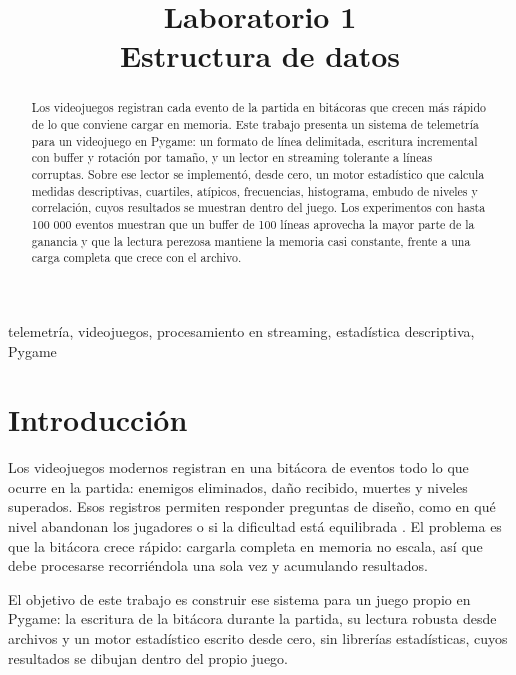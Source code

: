 \documentclass[conference]{IEEEtran}
\begin{document}
\title{Laboratorio 1\\Estructura de datos}

\author{
}

\maketitle

\begin{abstract}
Los videojuegos registran cada evento de la partida en bitácoras que crecen más rápido de lo que conviene cargar en memoria. Este trabajo presenta un sistema de telemetría para un videojuego en Pygame: un formato de línea delimitada, escritura incremental con buffer y rotación por tamaño, y un lector en streaming tolerante a líneas corruptas. Sobre ese lector se implementó, desde cero, un motor estadístico que calcula medidas descriptivas, cuartiles, atípicos, frecuencias, histograma, embudo de niveles y correlación, cuyos resultados se muestran dentro del juego. Los experimentos con hasta 100 000 eventos muestran que un buffer de 100 líneas aprovecha la mayor parte de la ganancia y que la lectura perezosa mantiene la memoria casi constante, frente a una carga completa que crece con el archivo.
\end{abstract}

\begin{IEEEkeywords}
telemetría, videojuegos, procesamiento en streaming, estadística descriptiva, Pygame
\end{IEEEkeywords}

\section{Introducción}
Los videojuegos modernos registran en una bitácora de eventos todo lo que ocurre en la partida: enemigos eliminados, daño recibido, muertes y niveles superados. Esos registros permiten responder preguntas de diseño, como en qué nivel abandonan los jugadores o si la dificultad está equilibrada \cite{drachen}. El problema es que la bitácora crece rápido: cargarla completa en memoria no escala, así que debe procesarse recorriéndola una sola vez y acumulando resultados.

El objetivo de este trabajo es construir ese sistema para un juego propio en Pygame: la escritura de la bitácora durante la partida, su lectura robusta desde archivos y un motor estadístico escrito desde cero, sin librerías estadísticas, cuyos resultados se dibujan dentro del propio juego.
\end{document}
